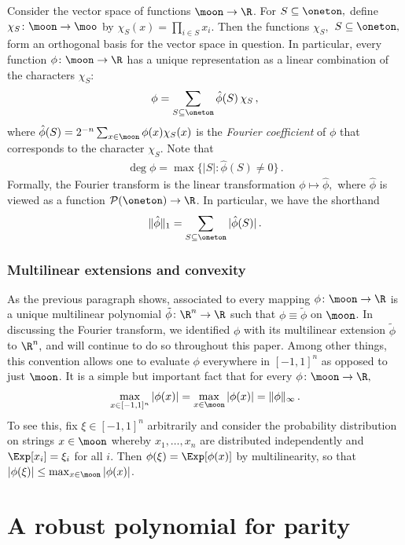 Consider the vector space of functions
$\moon\to\R$. For $S\subseteq\oneton,$ define
$\chi_S\colon\moon\to\moo$ by $\chi_S(x) =\prod_{i\in
S} x_i$. Then the functions $\chi_S,$
$S\subseteq\oneton,$ form an orthogonal basis for the
vector space in question.  In particular, every
function $\phi\colon\moon\to\R$ has a unique
representation as a linear combination of the
characters $\chi_S$: 
\[\phi=\sum_{S\subseteq\oneton} \hat \phi(S)\,\chi_S\,,\]
where $\hat\phi(S)=2^{-n}\sum_{x\in\moon}
\phi(x)\chi_S(x)$ is the \emph{Fourier coefficient} of
$\phi$ that corresponds to the character $\chi_S$. 
Note that 
\begin{align*}
\deg \phi= \max\{|S|:\hat \phi(S)\ne 0\}\,.
\end{align*}
Formally, the Fourier transform is the linear
transformation $\phi\mapsto\hat\phi,$ where $\hat\phi$ 
is viewed as a function 
$\mathcal{P}(\oneton)\to\R$. In particular, we have
the shorthand
\begin{align*}
\|\hat\phi\|_1=\sum_{S\subseteq\oneton}|\hat\phi(S)|\,.
\end{align*}

\subsubsection*{Multilinear extensions and convexity}

As the previous paragraph shows, associated to every mapping 
$\phi\colon\moon\to\R$ is a unique
multilinear polynomial $\tilde
\phi\colon\R^n\to\R$ 
such that $\phi\equiv \tilde \phi$ on
$\moon$. In discussing the Fourier transform, we
identified $\phi$ with its
multilinear extension $\tilde \phi$ to $\R^n,$ and 
will continue to do so throughout this paper. Among
other things, this
convention allows one to evaluate $\phi$ everywhere
in $[-1,1]^n$ as opposed to just $\moon$. 
It is a simple but important fact that for every
$\phi\colon\moon\to\R,$ 
\begin{align*}
\max_{x\in[-1,1]^n}|\phi(x)|
=\max_{x\in\moon}|\phi(x)| = \|\phi\|_\infty\,.
\end{align*}
To see this, fix $\xi\in[-1,1]^n$ arbitrarily and
consider the probability distribution on strings $x\in\moon$
whereby $x_1,\dots,x_n$ are distributed independently and
$\Exp[x_i]=\xi_i$  for all $i$. Then
$\phi(\xi)=\Exp[\phi(x)]$ by multilinearity, so that
$|\phi(\xi)|\leq\max_{x\in\moon}|\phi(x)|$.

\section{A robust polynomial for parity}
\label{sec:robust-parity}

